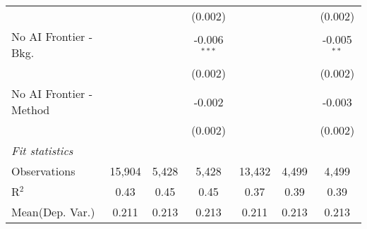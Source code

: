 \begin{tabular}{lcccccc}
                           &          &         & (0.002)        &         &              & (0.002)\\   
   No AI Frontier - Bkg.   &          &         & -0.006$^{***}$ &         &              & -0.005$^{**}$\\   
                           &          &         & (0.002)        &         &              & (0.002)\\   
   No AI Frontier - Method &          &         & -0.002         &         &              & -0.003\\   
                           &          &         & (0.002)        &         &              & (0.002)\\   
   \midrule
   \emph{Fit statistics}\\
   Observations            & 15,904   & 5,428   & 5,428          & 13,432  & 4,499        & 4,499\\  
   R$^2$                   & 0.43     & 0.45    & 0.45           & 0.37    & 0.39         & 0.39\\  
Mean(Dep. Var.) & 0.211 & 0.213 & 0.213 & 0.211 & 0.213 & 0.213 \\
   

\end{tabular}
